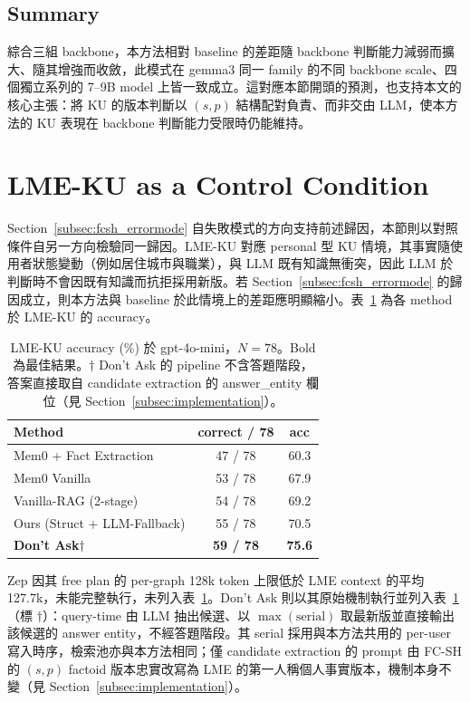 \subsection*{Summary}
 
綜合三組 backbone，本方法相對 baseline 的差距隨 backbone 判斷能力減弱而擴大、隨其增強而收斂，此模式在 gemma3 同一 family 的不同 backbone scale、四個獨立系列的 7--9B model 上皆一致成立。這對應本節開頭的預測，也支持本文的核心主張：將 KU 的版本判斷以 $(s, p)$ 結構配對負責、而非交由 LLM，使本方法的 KU 表現在 backbone 判斷能力受限時仍能維持。
 
 
\section{LME-KU as a Control Condition}
\label{subsec:lme_control}
 
Section~\ref{subsec:fcsh_errormode} 自失敗模式的方向支持前述歸因，本節則以對照條件自另一方向檢驗同一歸因。LME-KU 對應 personal 型 KU 情境，其事實隨使用者狀態變動（例如居住城市與職業），與 LLM 既有知識無衝突，因此 LLM 於判斷時不會因既有知識而抗拒採用新版。若 Section~\ref{subsec:fcsh_errormode} 的歸因成立，則本方法與 baseline 於此情境上的差距應明顯縮小。表~\ref{tab:lme_main} 為各 method 於 LME-KU 的 accuracy。
 
\begin{table}[!htb]
\centering
\caption{LME-KU accuracy (\%) 於 gpt-4o-mini，$N=78$。Bold 為最佳結果。$\dagger$ Don't Ask 的 pipeline 不含答題階段，答案直接取自 candidate extraction 的 answer\_entity 欄位（見 Section~\ref{subsec:implementation}）。}
\label{tab:lme_main}
\small
\begin{tabular}{lcc}
\toprule
Method & correct / 78 & acc \\
\midrule
Mem0 + Fact Extraction & 47 / 78 & 60.3 \\
Mem0 Vanilla & 53 / 78 & 67.9 \\
Vanilla-RAG (2-stage) & 54 / 78 & 69.2 \\
Ours (Struct + LLM-Fallback) & 55 / 78 & 70.5 \\
\textbf{Don't Ask}$\dagger$ & \textbf{59 / 78} & \textbf{75.6} \\
\bottomrule
\end{tabular}
\end{table}
 
Zep 因其 free plan 的 per-graph 128k token 上限低於 LME context 的平均 127.7k，未能完整執行，未列入表~\ref{tab:lme_main}。Don't Ask 則以其原始機制執行並列入表~\ref{tab:lme_main}（標 $\dagger$）：query-time 由 LLM 抽出候選、以 $\max(\text{serial})$ 取最新版並直接輸出該候選的 answer entity，不經答題階段。其 serial 採用與本方法共用的 per-user 寫入時序，檢索池亦與本方法相同；僅 candidate extraction 的 prompt 由 FC-SH 的 $(s, p)$ factoid 版本忠實改寫為 LME 的第一人稱個人事實版本，機制本身不變（見 Section~\ref{subsec:implementation}）。
 
